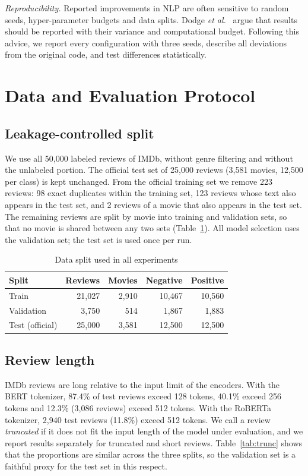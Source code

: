 \documentclass[conference]{IEEEtran}
\begin{document}
\textit{Reproducibility.} Reported improvements in NLP are often sensitive to random seeds, hyper-parameter budgets and data splits. Dodge \textit{et al.}~\cite{dodge2019} argue that results should be reported with their variance and computational budget. Following this advice, we report every configuration with three seeds, describe all deviations from the original code, and test differences statistically.

\section{Data and Evaluation Protocol}

\subsection{Leakage-controlled split}
We use all 50{,}000 labeled reviews of IMDb, without genre filtering and without the unlabeled portion. The official test set of 25{,}000 reviews (3{,}581 movies, 12{,}500 per class) is kept unchanged. From the official training set we remove 223 reviews: 98 exact duplicates within the training set, 123 reviews whose text also appears in the test set, and 2 reviews of a movie that also appears in the test set. The remaining reviews are split by movie into training and validation sets, so that no movie is shared between any two sets (Table~\ref{tab:data}). All model selection uses the validation set; the test set is used once per run.

\begin{table}[t]
\caption{Data split used in all experiments}
\label{tab:data}
\centering
\begin{tabular}{lrrrr}
\toprule
Split & Reviews & Movies & Negative & Positive \\
\midrule
Train & 21{,}027 & 2{,}910 & 10{,}467 & 10{,}560 \\
Validation & 3{,}750 & 514 & 1{,}867 & 1{,}883 \\
Test (official) & 25{,}000 & 3{,}581 & 12{,}500 & 12{,}500 \\
\bottomrule
\end{tabular}
\end{table}

\subsection{Review length}
IMDb reviews are long relative to the input limit of the encoders. With the BERT tokenizer, 87.4\% of test reviews exceed 128 tokens, 40.1\% exceed 256 tokens and 12.3\% (3{,}086 reviews) exceed 512 tokens. With the RoBERTa tokenizer, 2{,}940 test reviews (11.8\%) exceed 512 tokens. We call a review \emph{truncated} if it does not fit the input length of the model under evaluation, and we report results separately for truncated and short reviews. Table~\ref{tab:trunc} shows that the proportions are similar across the three splits, so the validation set is a faithful proxy for the test set in this respect.
\end{document}
